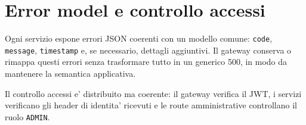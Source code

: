 \section{Error model e controllo accessi}

Ogni servizio espone errori JSON coerenti con un modello comune: \texttt{code}, \texttt{message}, \texttt{timestamp} e, se necessario, dettagli aggiuntivi. Il gateway conserva o rimappa questi errori senza trasformare tutto in un generico 500, in modo da mantenere la semantica applicativa.

Il controllo accessi e' distribuito ma coerente: il gateway verifica il JWT, i servizi verificano gli header di identita' ricevuti e le route amministrative controllano il ruolo \texttt{ADMIN}.

